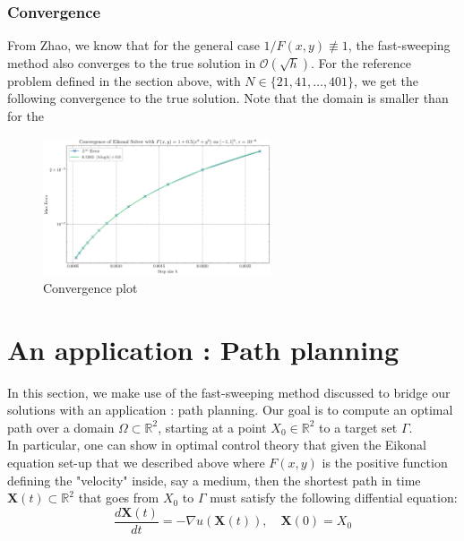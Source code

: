 \documentclass[11pt]{article}
\theoremstyle{definition}
\theoremstyle{remark}
\newcommand{\R}{\mathbb{R}}
\begin{document}
\subsubsection{Convergence}
From Zhao, we know that for the general case $1/F(x,y)\not\equiv1$, the fast-sweeping method also converges to the true solution in $\mathcal{O}(\sqrt{h})$. For the reference problem defined in the section above, with $N\in\{21,41,\dots,401\}$, we get the following convergence to the true solution. Note that the domain is smaller than for the 

\begin{figure}[h]
  \centering
  \includegraphics[width=0.6\textwidth]{plots/convergence2d_atan_step_size.png}
  \caption{Convergence plot}
  \label{fig:convarctan}
\end{figure}

\vspace{10pt}



\newpage

\section{An application : Path planning}
In this section, we make use of the fast-sweeping method discussed to bridge our solutions with an application : path planning. Our goal is to compute an optimal path over a domain $\Omega\subset\R^2$, starting at a point $X_0\in \R^2$ to a target set $\Gamma$. \\
In particular, one can show in optimal control theory that given the Eikonal equation set-up that we described above where $F(x,y)$ is the positive function defining the "velocity" inside, say a medium, then the shortest path in time $\textbf{X}(t)\subset \R^2$ that goes from $X_0$ to $\Gamma$ must satisfy the following diffential equation:
\begin{equation}
\label{general_form_optimal_path_DE}
    \frac{d\textbf{X}(t)}{dt}=-\nabla u(\textbf{X}(t)), \quad \textbf{X}(0)=X_0
\end{equation}
\end{document}
